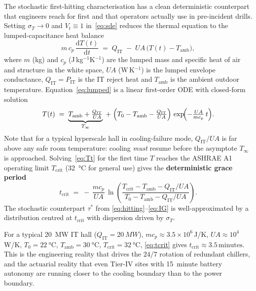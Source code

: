 \documentclass[11pt,a4paper]{article}
\theoremstyle{ia}
\newcommand{\1}{\mathbf{1}}
\newcommand{\dd}{\mathrm{d}}
\begin{document}
The stochastic first-hitting characterisation has a clean
deterministic counterpart that engineers reach for first and that
operators actually use in pre-incident drills. Setting $\sigma_T\!\to\! 0$
and $V_t\equiv 1$ in~\eqref{eq:sde} reduces the thermal equation
to the lumped-capacitance heat balance
\begin{equation}\label{eq:lumped}
   m\,c_p\,\frac{\dd T(t)}{\dd t}
   \;=\; Q_{\mathrm{IT}} \;-\; UA\,\bigl(T(t)-T_{\mathrm{amb}}\bigr),
\end{equation}
where $m$ (kg) and $c_p$ (J\,kg$^{-1}$K$^{-1}$) are the lumped mass
and specific heat of air and structure in the white space, $UA$
(W\,K$^{-1}$) is the lumped envelope conductance, $Q_{\mathrm{IT}}=P_{\mathrm{IT}}$
is the IT reject heat and $T_{\mathrm{amb}}$ is the ambient outdoor
temperature. Equation~\eqref{eq:lumped} is a linear first-order ODE
with closed-form solution
\begin{equation}\label{eq:Tt}
   T(t) \;=\; \underbrace{T_{\mathrm{amb}}+\tfrac{Q_{\mathrm{IT}}}{UA}}_{T_\infty}
   \;+\;\Bigl(T_0-T_{\mathrm{amb}}-\tfrac{Q_{\mathrm{IT}}}{UA}\Bigr)\,
   \exp\!\Bigl(-\tfrac{UA}{m c_p}\,t\Bigr).
\end{equation}
Note that for a typical hyperscale hall in cooling-failure mode,
$Q_{\mathrm{IT}}/UA$ is far above any safe room temperature: cooling
\emph{must} resume before the asymptote $T_\infty$ is approached.
Solving~\eqref{eq:Tt} for the first time $T$ reaches the ASHRAE A1
operating limit $T_{\mathrm{crit}}$ (\SI{32}{\celsius} for general use)
gives the \textbf{deterministic grace period}
\begin{equation}\label{eq:tcrit}
   \boxed{\;
   t_{\mathrm{crit}} \;=\; -\,\frac{m c_p}{UA}\,
   \ln\!\left(
     \frac{T_{\mathrm{crit}}-T_{\mathrm{amb}}-Q_{\mathrm{IT}}/UA}
          {T_0-T_{\mathrm{amb}}-Q_{\mathrm{IT}}/UA}
   \right).\;}
\end{equation}
The stochastic counterpart $\tau^*$ from \eqref{eq:hitting}--\eqref{eq:IG}
is well-approximated by a distribution centred at $t_{\mathrm{crit}}$
with dispersion driven by $\sigma_T$.

\begin{rbox}
For a typical \SI{20}{\mega\watt} IT hall ($Q_{\mathrm{IT}}=\SI{20}{MW}$),
$m c_p \approx 3.5\times 10^{6}$\,J/K, $UA\approx 10^{4}$\,W/K,
$T_0=\SI{22}{\celsius}$, $T_{\mathrm{amb}}=\SI{30}{\celsius}$,
$T_{\mathrm{crit}}=\SI{32}{\celsius}$, \eqref{eq:tcrit} gives
$t_{\mathrm{crit}}\approx 3.5\,\mathrm{minutes}$. This is the
engineering reality that drives the $24/7$ rotation of redundant
chillers, and the actuarial reality that even Tier-IV sites with
\SI{15}{minute} battery autonomy are running closer to the cooling
boundary than to the power boundary.
\end{rbox}
\end{document}
